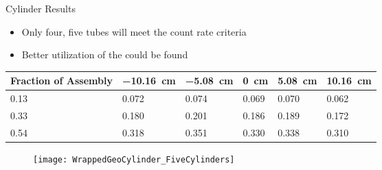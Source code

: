 \begin{frame}{Cylinder Results}
  \small
  \begin{itemize}
    \item Only four, five tubes will meet the count rate criteria
    \item Better utilization of the  could be found
  \end{itemize}
\begin{table}
  \tiny
	\begin{tabular}{m{2cm} | m{1cm} m{1cm} m{1cm} m{1cm} m{1cm}}
		\toprule
		Fraction of Assembly & \SI{-10.16}{\cm} & \SI{-5.08}{\cm} & \SI{0}{\cm} & \SI{5.08}{\cm} & \SI{10.16}{\cm}\\
		\midrule
		0.13 & 0.072 & 0.074 & 0.069 & 0.070 & 0.062 \\
		0.33	& 0.180 & 0.201 & 0.186 & 0.189 & 0.172 \\
		0.54	& 0.318 & 0.351 & 0.330 & 0.338 & 0.310 \\
		\bottomrule
	\end{tabular}
\end{table}
\begin{figure}
  \centering
  \texttt{[image: WrappedGeoCylinder\_FiveCylinders]}
\end{figure}
\end{frame}
